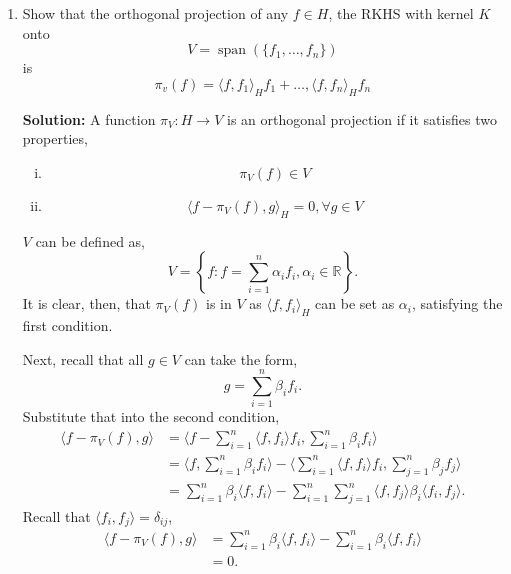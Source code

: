 \documentclass{article}[12pt]
\begin{document}
\begin{enumerate}
\item Show that the orthogonal projection of any $f \in H$, the RKHS with kernel $K$ onto 
\begin{equation}
	V=\operatorname{span}\left(\{f_1,\ldots,f_n\}\right)
\end{equation} is 
\begin{equation}
\pi_v(f)=\langle f,f_1\rangle_H f_1+\ldots,\langle f,f_n\rangle_H f_n
\end{equation}

\textbf{Solution:} A function $\pi_V : H \rightarrow V$ is an orthogonal projection if it satisfies two properties,
\begin{enumerate}[(i)]
	\item \[
			\pi_V(f) \in V
	\]
	\item \[
			\langle f- \pi_V(f), g \rangle_H = 0, \forall g \in V
	\] 
\end{enumerate}
$V$ can be defined as,
\begin{equation}
	V = \left\{ f: f = \sum^{n}_{i=1} \alpha_i f_i, \alpha_i \in \mathbb R   \right\}.
\end{equation}
It is clear, then, that $\pi_V(f)$ is in $V$ as $\langle f, f_i \rangle_H$ can be set as $\alpha_i$, satisfying the first condition.

Next, recall that all $g \in V$ can take the form,
\begin{equation}
	g = \sum^{n}_{i=1} \beta_i f_i. 
\end{equation}
Substitute that into the second condition,
\begin{equation}
	\begin{aligned}
		\langle f - \pi_V(f), g \rangle &= \langle f - \sum^{n}_{i=1} \langle f, f_i \rangle f_i, \sum^{n}_{i=1} \beta_i f_i   \rangle \\
						&= \langle f, \sum^{n}_{i=1} \beta_i f_i \rangle - \langle \sum^{n}_{i=1} \langle f, f_i \rangle f_i, \sum^{n}_{j=1} \beta_j f_j   \rangle \\
						&= \sum^{n}_{i=1} \beta_i \langle f, f_i \rangle - \sum^{n}_{i=1} \sum^{n}_{j=1}  \langle f, f_j \rangle \beta_i \langle f_i, f_j \rangle.  
	\end{aligned}
\end{equation}
Recall that $ \langle f_i, f_j \rangle = \delta_{ij}$,
\begin{equation}
\begin{aligned}
	\langle f - \pi_V(f), g \rangle &= \sum^{n}_{i=1} \beta_i \langle f, f_i \rangle - \sum^{n}_{i=1} \beta_i \langle f, f_i \rangle \\
					&= 0.
\end{aligned}	
\end{equation}


\end{enumerate}
\end{document}
